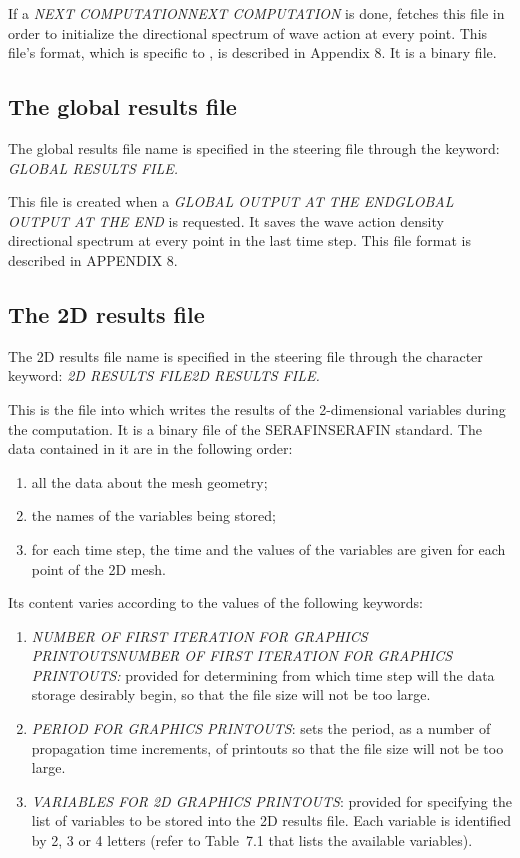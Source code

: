  If a \textit{NEXT COMPUTATIONNEXT COMPUTATION} is done\textit{, }\tomawac fetches this file in order to initialize the directional spectrum of wave action at every point. This file's format, which is specific to \tomawac, is described in Appendix 8. It is a binary file.


\subsection{ The global results file}

 The global results file name is specified in the steering file through the keyword: \textit{GLOBAL RESULTS FILE.}

 This file is created when a \textit{GLOBAL OUTPUT AT THE ENDGLOBAL OUTPUT AT THE END} is requested. It saves the wave action density directional spectrum at every point in the last time step. This file format is described in APPENDIX 8.


\subsection{ The 2D results file }

 The 2D results file name is specified in the steering file through the character keyword: \textit{2D RESULTS FILE2D RESULTS FILE.}

 This is the file into which \tomawac writes the results of the 2-dimensional variables during the computation. It is a binary file of the SERAFINSERAFIN standard. The data contained in it are in the following order:

\begin{enumerate}
\item  all the data about the mesh geometry;

\item  the names of the variables being stored;

\item  for each time step, the time and the values of the variables are given for each point of the 2D mesh.
\end{enumerate}

 Its content varies according to the values of the following keywords:

\begin{enumerate}
\item  \textit{NUMBER OF FIRST ITERATION FOR GRAPHICS PRINTOUTSNUMBER OF FIRST ITERATION FOR GRAPHICS PRINTOUTS:} provided for determining from which time step will the data storage desirably begin, so that the file size will not be too large.

\item  \textit{PERIOD FOR GRAPHICS PRINTOUTS}: sets the period, as a number of propagation time increments, of printouts so that the file size will not be too large.

\item  \textit{VARIABLES FOR 2D GRAPHICS PRINTOUTS}: provided for specifying the list of variables to be stored into the 2D results file. Each variable is identified by 2, 3 or 4 letters (refer to Table~7.1 that lists the available variables).
\end{enumerate}



